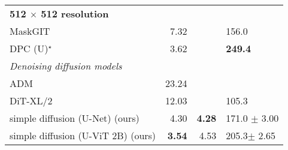 \begin{table}
{\begin{tabular}{l r r l}
    \midrule
    \textbf{512 $\times$ 512 resolution} \\ 
    MaskGIT \citep{chang2022maskgit} & 7.32 & & 156.0 \\
    DPC (U)$^\star$ \citep{anonymous2023discrete} & 3.62 &  & \textbf{249.4} \\ \midrule
    \textit{Denoising diffusion models} \\ 
    ADM \citep{dhariwal2021diffusionbeatgans}& 23.24 \\
    DiT-XL/2 \citep{peebles2022scalable} & 12.03 & & 105.3 \\
    simple diffusion (U-Net) (ours) & 4.30 & \textbf{4.28} & 171.0 {\small $\pm$ 3.00} \\
    simple diffusion (U-ViT 2B) (ours) & \textbf{3.54} & 4.53 & 205.3{\small $\pm$ 2.65} \\
        \bottomrule
    \end{tabular}}
    \vspace{-.2cm}
\end{table}

\begin{table}
    \centering
    \vspace{-.2cm}
    \caption{Text to image result on zero-shot COCO}\vspace{-.2cm}
    \label{tab:text_to_image_fid}
\end{table}

